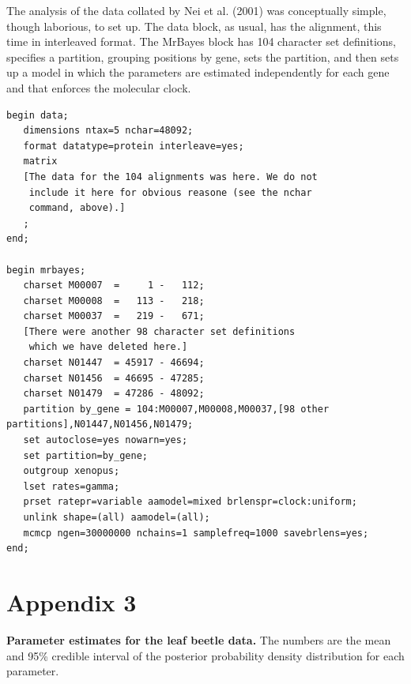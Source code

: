 \documentclass{svmult}
\begin{document}
\bigskip

 The analysis of the data collated by Nei et al. (2001) was conceptually simple, though
laborious, to set up. The data block, as usual, has the alignment, this time in interleaved format. The MrBayes block has 104 character set definitions, 
specifies a partition, grouping positions by gene, sets the partition, and then sets up a model in which the parameters are estimated independently for
each gene and that enforces the molecular clock.
\scriptsize
\begin{verbatim}
begin data;
   dimensions ntax=5 nchar=48092;
   format datatype=protein interleave=yes;
   matrix
   [The data for the 104 alignments was here. We do not
    include it here for obvious reasone (see the nchar
    command, above).]
   ;
end;

begin mrbayes;
   charset M00007  =     1 -   112;
   charset M00008  =   113 -   218;
   charset M00037  =   219 -   671;
   [There were another 98 character set definitions
    which we have deleted here.]
   charset N01447  = 45917 - 46694;
   charset N01456  = 46695 - 47285;
   charset N01479  = 47286 - 48092;
   partition by_gene = 104:M00007,M00008,M00037,[98 other partitions],N01447,N01456,N01479;
   set autoclose=yes nowarn=yes;
   set partition=by_gene;
   outgroup xenopus;
   lset rates=gamma;
   prset ratepr=variable aamodel=mixed brlenspr=clock:uniform;
   unlink shape=(all) aamodel=(all);
   mcmcp ngen=30000000 nchains=1 samplefreq=1000 savebrlens=yes;
end;

\end{verbatim}
\normalsize


\newpage

\section*{Appendix 3}

{\bf Parameter estimates for the leaf beetle data.} The numbers are the mean and 95\% credible interval of the posterior probability
density distribution for each parameter.
\end{document}
